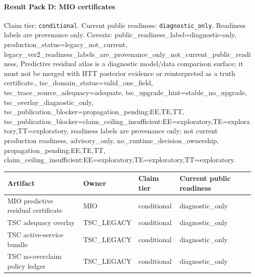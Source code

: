 \paragraph{Result Pack D: MIO certificates}
Claim tier: \texttt{conditional}. Current public readiness:
\texttt{diagnostic\_only}. Readiness labels are
provenance only. Caveats: public\_readiness\_label=diagnostic-only, production\_status=legacy\_not\_current, legacy\_ver2\_readiness\_labels\_are\_provenance\_only\_not\_current\_public\_readiness, Predictive residual atlas is a diagnostic model/data comparison surface; it must not be merged with HTT posterior evidence or reinterpreted as a truth certificate., tsc\_domain\_status=valid\_one\_field, tsc\_trace\_source\_adequacy=adequate, tsc\_upgrade\_hint=stable\_no\_upgrade, tsc\_overlay\_diagnostic\_only, tsc\_publication\_blocker=propagation\_pending:EE,TE,TT, tsc\_publication\_blocker=claim\_ceiling\_insufficient:EE=exploratory,TE=exploratory,TT=exploratory, readiness labels are provenance only; not current production readiness, advisory\_only, no\_runtime\_decision\_ownership, propagation\_pending:EE,TE,TT, claim\_ceiling\_insufficient:EE=exploratory,TE=exploratory,TT=exploratory.

\begin{center}
\begin{tabular}{llll}
\hline
Artifact & Owner & Claim tier & Current public readiness \\
\hline
MIO predictive residual certificate & MIO & conditional & diagnostic\_only \\
TSC adequacy overlay & TSC\_LEGACY & conditional & diagnostic\_only \\
TSC active-service bundle & TSC\_LEGACY & conditional & diagnostic\_only \\
TSC no-overclaim policy ledger & TSC\_LEGACY & conditional & diagnostic\_only \\
\hline
\end{tabular}
\end{center}
